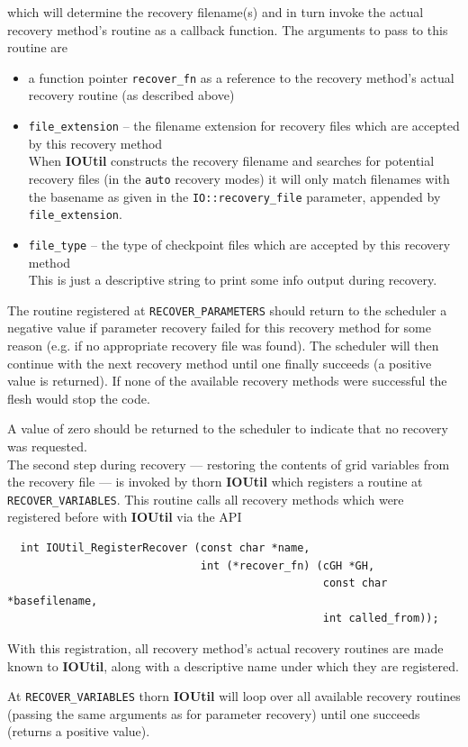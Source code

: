 \documentclass{article}
\begin{document}
which will determine the recovery filename(s) and in turn invoke the actual
recovery method's routine as a callback function. The arguments to pass to this
routine are

\begin{itemize}
  \item a function pointer {\tt recover\_fn} as a reference to the recovery
    method's actual recovery routine (as described above)

  \item {\tt file\_extension} -- the filename extension for recovery files
    which are accepted by this recovery method\\
    When {\bf IOUtil} constructs the recovery filename and searches for
    potential recovery files (in the {\tt auto} recovery modes) it will only
    match filenames with the basename as given in the {\tt IO::recovery\_file}
    parameter, appended by {\tt file\_extension}.

  \item {\tt file\_type} -- the type of checkpoint files which are accepted by
    this recovery method\\
    This is just a descriptive string to print some info output during recovery.
\end{itemize}

The routine registered at {\tt RECOVER\_PARAMETERS} should return to
the scheduler a negative value if parameter recovery failed for this recovery
method for some reason (e.g. if no appropriate recovery file was found).
The scheduler will then continue with the next recovery method until one
finally succeeds (a positive value is returned). If none of the available
recovery methods were successful the flesh would stop the code.

A value of zero should be returned to the scheduler to indicate that no
recovery was requested.\\

The second step during recovery --- restoring the contents of grid variables
from the recovery file --- is invoked by thorn {\bf IOUtil} which registers
a routine at {\tt RECOVER\_VARIABLES}. This routine calls all recovery
methods which were registered before with {\bf IOUtil} via the API

\begin{verbatim}
  int IOUtil_RegisterRecover (const char *name,
                              int (*recover_fn) (cGH *GH,
                                                 const char *basefilename,
                                                 int called_from));
\end{verbatim}

With this registration, all recovery method's actual recovery routines are made
known to {\bf IOUtil}, along with a descriptive name under which they are
registered.

At {\tt RECOVER\_VARIABLES} thorn {\bf IOUtil} will loop over all 
available recovery routines (passing the same arguments as for parameter
recovery) until one succeeds (returns a positive value).

\end{document}
